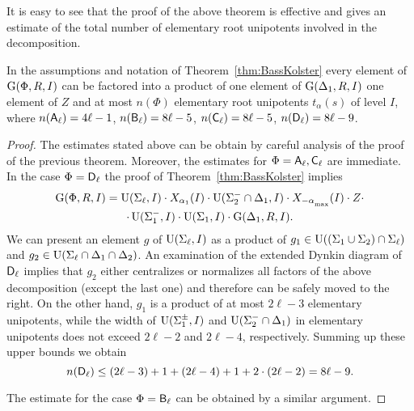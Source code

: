 It is easy to see that the proof of the above theorem is effective and gives an estimate of the total number of elementary root unipotents involved in the decomposition.
\begin{cor}
In the assumptions and notation of Theorem~\ref{thm:BassKolster} every element of $\operatorname{G}(\Phi,R,I)$ 
can be factored into a product of one element of $\operatorname{G}(\Delta_1,R,I)$ one element of $Z$ and at most $n(\Phi)$ elementary root unipotents $t_{\alpha}(s)$ of level $I$, where
$n(\mathsf{A}_\ell)= 4 \ell - 1$, $n(\mathsf{B}_\ell)= 8 \ell - 5$, $n(\mathsf{C}_\ell)= 8 \ell - 5$, $n(\mathsf{D}_\ell)= 8 \ell - 9$. \end{cor}
\begin{proof}
The estimates stated above can be obtain by careful analysis of the proof of the previous theorem.
Moreover, the estimates for $\Phi=\mathsf{A}_\ell, \mathsf{C}_\ell$ are immediate.
In the case $\Phi=\mathsf{D}_\ell$ the proof of Theorem~\ref{thm:BassKolster} implies 
\begin{multline}\nonumber
\G(\Phi,R,I)=  \U(\Sigma_\ell,I) \cdot X_{\alpha_1}(I) \cdot \U(\Sigma_2^-\cap\Delta_1,I) \cdot X_{-\alpha\ssub{\mathrm{max}}}(I) \cdot Z  \cdot \\ \cdot \U(\Sigma_1^-,I) \cdot \U(\Sigma_1,I) \cdot \G(\Delta_1,R,I).
\end{multline}
We can present an element $g$ of $\operatorname{U}(\Sigma_\ell, I)$ as a product of $g_1 \in \operatorname{U}((\Sigma_1 \cup \Sigma_2) \cap \Sigma_\ell)$ and $g_2\in \operatorname{U}(\Sigma_\ell\cap\Delta_1\cap\Delta_2)$.
An examination of the extended Dynkin diagram of $\mathsf{D}_\ell$ implies that $g_2$ either centralizes or normalizes all factors of the above decomposition (except the last one) and therefore can be safely moved to the right.
On the other hand, $g_1$ is a product of at most $2\ell-3$ elementary unipotents, while the width of $\operatorname{U}(\Sigma_1^\pm, I)$ and $\operatorname{U}(\Sigma_2^-\cap\Delta_1)$ in elementary unipotents does not exceed $2\ell-2$ and $2\ell-4$, respectively.
Summing up these upper bounds we obtain
$$n(\mathsf{D}_\ell)\leq (2\ell-3) + 1 + (2\ell - 4) + 1 + 2\cdot (2\ell - 2) = 8\ell - 9.$$

The estimate for the case $\Phi=\mathsf{B}_\ell$ can be obtained by a similar argument. \end{proof}

